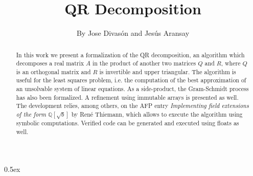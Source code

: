 \documentclass[11pt,a4paper]{article}
\begin{document}
\title{QR Decomposition}
\author{By Jose Divas\'on and Jes\'us Aransay}
\maketitle


\begin{abstract}
In this work we present a formalization of the QR decomposition, an algorithm which decomposes
a real matrix $A$ in the product of another two matrices $Q$ and $R$, where $Q$ is an orthogonal matrix
and $R$ is invertible and upper triangular. The algorithm is useful for the least squares problem, 
i.e. the computation of the best approximation of an unsolvable system of linear equations. 
As a side-product, the Gram-Schmidt process has also been formalized. A refinement using immutable arrays is presented as well. 
The development relies, among others, on the AFP entry \emph{Implementing field extensions of the form $\mathbb{Q}[\sqrt{b}]$} by Ren\'e Thiemann,
which allows to execute the algorithm using symbolic computations. Verified code can be generated and executed using floats as well.

\end{abstract}

\tableofcontents

\parindent 0pt\parskip 0.5ex


\end{document}
